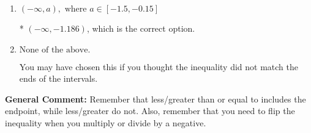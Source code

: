\documentclass{extbook}[14pt]
\begin{document}
\begin{enumerate}
{\begin{enumerate}[label=\Alph*.]
 $(-\infty, 1.186)$, which corresponds to negating the endpoint of the solution.
\item \( (-\infty, a), \text{ where } a \in [-1.5, -0.15] \)

* $(-\infty, -1.186)$, which is the correct option.
\item \( \text{None of the above}. \)

You may have chosen this if you thought the inequality did not match the ends of the intervals.
\end{enumerate}

\textbf{General Comment:} Remember that less/greater than or equal to includes the endpoint, while less/greater do not. Also, remember that you need to flip the inequality when you multiply or divide by a negative.
}
\end{enumerate}
\end{document}

